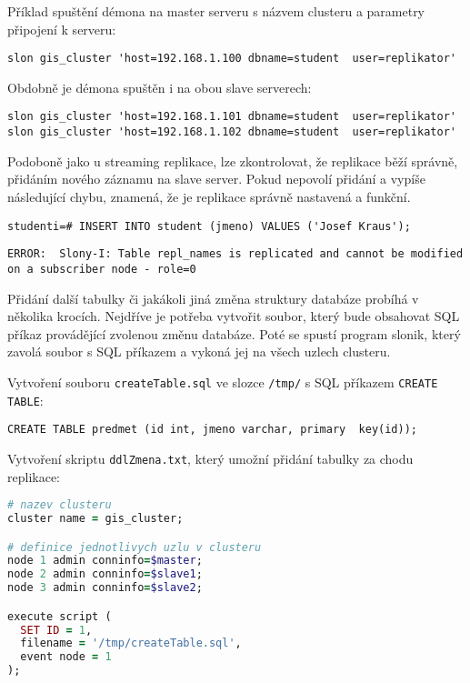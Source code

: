 Příklad spuštění démona na master serveru s názvem clusteru a parametry připojení k serveru:
\begin{lstlisting}
slon gis_cluster 'host=192.168.1.100 dbname=student  user=replikator'
\end{lstlisting}
Obdobně je démona spuštěn i na obou slave serverech:
\begin{lstlisting}
slon gis_cluster 'host=192.168.1.101 dbname=student  user=replikator'
slon gis_cluster 'host=192.168.1.102 dbname=student  user=replikator'
\end{lstlisting}

Podoboně jako u streaming replikace, lze zkontrolovat, že replikace běží správně, přidáním nového záznamu na slave server. Pokud nepovolí přidání a vypíše následující chybu, znamená, že je replikace správně nastavená a funkční.

\begin{lstlisting}
studenti=# INSERT INTO student (jmeno) VALUES ('Josef Kraus');
\end{lstlisting}
\begin{lstlisting}[identifierstyle=\color{black},stringstyle=\color{black},keywordstyle=\color{black}]
ERROR:  Slony-I: Table repl_names is replicated and cannot be modified on a subscriber node - role=0
\end{lstlisting}

Přidání další tabulky či jakákoli jiná změna struktury databáze probíhá v několika krocích. Nejdříve je potřeba vytvořit soubor, který bude obsahovat SQL příkaz provádějící zvolenou změnu databáze. Poté se spustí program slonik, který zavolá soubor s SQL příkazem a vykoná jej na všech uzlech clusteru. 

Vytvoření souboru \texttt{createTable.sql} ve slozce \texttt{/tmp/} s SQL příkazem \texttt{CREATE TABLE}:

\begin{lstlisting}
CREATE TABLE predmet (id int, jmeno varchar, primary  key(id));
\end{lstlisting}

Vytvoření skriptu \texttt{ddlZmena.txt}, který umožní přidání tabulky za chodu replikace:

\begin{lstlisting}[language=ruby]
# nazev clusteru
cluster name = gis_cluster;

# definice jednotlivych uzlu v clusteru
node 1 admin conninfo=$master;
node 2 admin conninfo=$slave1;
node 3 admin conninfo=$slave2;

execute script (
  SET ID = 1,
  filename = '/tmp/createTable.sql',
  event node = 1
);

\end{lstlisting}

